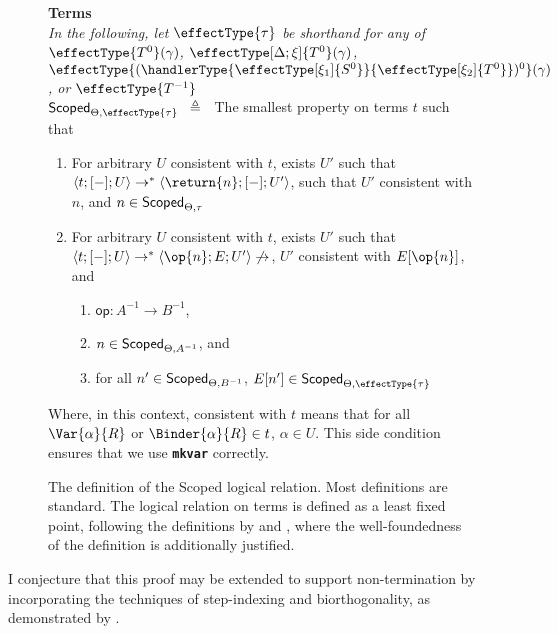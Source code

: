 \begin{figure}
\begin{source-desc}
\textbf{Terms}\\
{\scriptsize{\textit{In the following, let $\effectType{\tau}$ be shorthand for any of $\effectType{T^{0}} (\gamma)$, $\effectType[\Delta; \xi]{T^{0}} (\gamma)$, $\effectType{(\handlerType{\effectType[\xi_1]{S^0}}{\effectType[\xi_2]{T^0}})^{0}} (\gamma)$, or $\effectType{T^{-1}}$}}}\\

$\scoped{\effectType{\tau}} \hspace{2mm} \triangleq \hspace{2mm}$ The smallest property on terms $t$ such that 
\begin{enumerate}
  \item For arbitrary $U$ consistent with $t$, exists $U'$ such that $\langle t;[-];U \rangle \to^{*} \langle \return{n}; [-]; U' \rangle$, such that $U'$ consistent with $n$, and $n \in \textsf{Scoped}_{{\Theta}, {\tau}}$ 
  \item For arbitrary $U$ consistent with $t$, exists $U'$ such that $\langle t;[-];U \rangle \to^{*} \langle \op{n}; E; U' \rangle \not\to$, $U'$ consistent with $E[\op{n}]$, and 
  \begin{enumerate}
    \item $\textsf{op}: A^{-1} \to B^{-1}$,
    \item $n \in \textsf{Scoped}_{{\Theta}, {A^{-1}}}$, and 
    \item for all $n' \in \textsf{Scoped}_{{\Theta}, {B^{-1}}}$, $E[n'] \in \scoped{\effectType{\tau}}$
  \end{enumerate}
\end{enumerate}
Where, in this context, consistent with $t$ means that for all $\Var{\alpha}{R}$ or $\Binder{\alpha}{R} \in t$, $\alpha \in U$. This side condition ensures that we use \textbf{\texttt{mkvar}} correctly.
\end{source-desc}
\caption{The definition of the \textsf{Scoped} logical relation. Most definitions are standard. The logical relation on terms is defined as a least fixed point, following the definitions by \citet{plotkin-2025} and \citet{kuchta-2023}, where the well-foundedness of the definition is additionally justified.}
\label{fig:logical-relation-defn}
\end{figure}

I conjecture that this proof may be extended to support non-termination by incorporating the techniques of step-indexing and biorthogonality, as demonstrated by \citet{biernacki-2017}.


